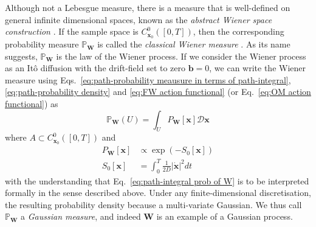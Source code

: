 
Although not a Lebesgue measure, there is a measure that is well-defined on general infinite dimensional spaces, known as the \textit{abstract Wiener space construction} \citep{grossAbstractWienerSpaces1967a, MeasureIntegrationTheory1972}. If the sample space is $C_{\mathbf{x}_0}^0([0,T])$, then the corresponding probability measure $\mathbb{P}_\mathbf{W}$ is called the \textit{classical Wiener measure} \citep{cameronTransformationsWeinerIntegrals1944b, cameronTransformationsWienerIntegrals1945a}. As its name suggests, $\mathbb{P}_\mathbf{W}$ is the law of the Wiener process. If we consider the Wiener process as an It\^{o} diffusion with the drift-field set to zero $\mathbf{b} = 0$, we can write the Wiener measure using Eqs.~\ref{eq:path-probability meausure in terms of path-integral}, \ref{eq:path-probability density} and \ref{eq:FW action functional} (or Eq.~\ref{eq:OM action functional}) as
\begin{equation} \label{eq:path-integral prob of W}
\mathbb{P}_\mathbf{W}(U) = \int_U P_\mathbf{W}[\mathbf{x}] \mathcal{D} \mathbf{x}
\end{equation}
where $A \subset C_{\mathbf{x}_0}^0([0,T])$ and
\begin{subequations}
\begin{align}
P_\mathbf{W}[\mathbf{x}] & \propto \exp( - S_0[\mathbf{x}] ) \\
S_0[\mathbf{x}] & = \int_0^T \frac{1}{2D} |\dot{\mathbf{x}}|^2 dt
\end{align}
\end{subequations}
with the understanding that Eq.~\ref{eq:path-integral prob of W} is to be interpreted formally in the sense described above. Under any finite-dimensional discretisation, the resulting probability density because a multi-variate Gaussian. We thus call $\mathbb{P}_\mathbf{W}$ a \textit{Gaussian measure}, and indeed $\mathbf{W}$ is an example of a Gaussian process.


